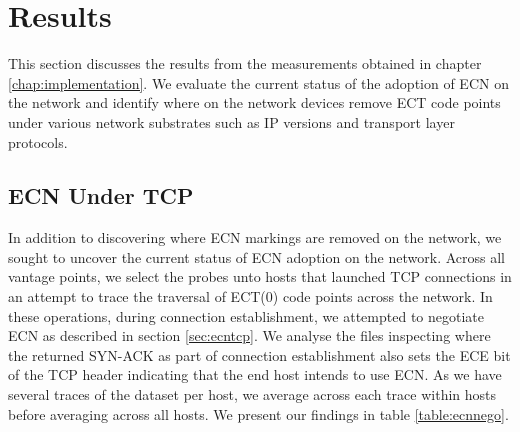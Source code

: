 \documentclass{l4proj}
\begin{document}
\chapter{Results}
\label{chap:evaluation}

This section discusses the results from the measurements obtained in chapter \ref{chap:implementation}. We evaluate the current status of the adoption of ECN on the network and identify where on the network devices remove ECT code points under various network substrates such as IP versions and transport layer protocols.

\section{ECN Under TCP}
\label{sec:tcpstrip}

In addition to discovering where ECN markings are removed on the network, we sought to uncover the current status of ECN adoption on the network. Across all vantage points, we select the probes unto hosts that launched TCP connections in an attempt to trace the traversal of ECT(0) code points across the network. In these operations, during connection establishment, we attempted to negotiate ECN as described in section \ref{sec:ecntcp}. We analyse the files inspecting where the returned SYN-ACK as part of connection establishment also sets the ECE bit of the TCP header indicating that the end host intends to use ECN. As we have several traces of the dataset per host, we average across each trace within hosts before averaging across all hosts. We present our findings in table \ref{table:ecnnego}.

\begin{table}[H]
\centering

\caption{Percentage of hosts willing to negotiate ECN by Host sample and IP version utilised. We notice no appreciable difference in ECN adoption between host samples, and a slight increase between IPv4 hosts to IPv6 hosts of the same host sample.}
\label{table:ecnnego}
\end{table}
\end{document}
